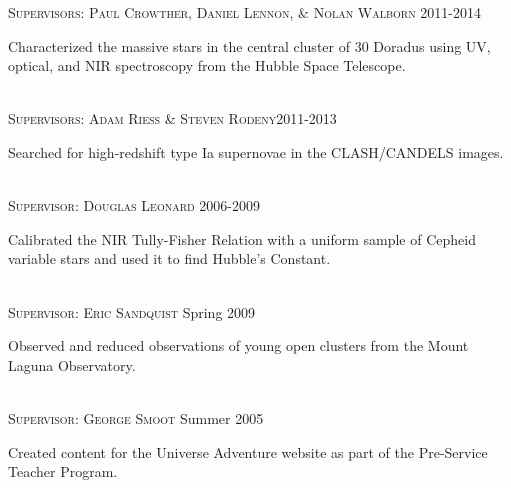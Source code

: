 \documentclass[10pt]{cv}
\begin{document}
\begin{llist}
\textsc{Supervisors: Paul Crowther, Daniel Lennon, \& Nolan Walborn} \hfill 2011-2014\\
\begin{minipage}[l]{0.7\textwidth}\vspace{0.15cm}
Characterized the massive stars in the central cluster of 30 Doradus using 
UV, optical, and NIR spectroscopy from the Hubble Space Telescope.\\
\end{minipage}
\\
\textsc{Supervisors: Adam Riess \& Steven Rodeny}\hfill 2011-2013\\
\begin{minipage}[l]{0.7\textwidth}\vspace{0.15cm}
Searched for high-redshift type Ia supernovae in the CLASH/CANDELS images.\\
\end{minipage}
\\
\textsc{Supervisor: Douglas Leonard} \hfill 2006-2009 \\
\begin{minipage}[l]{0.7\textwidth}\vspace{0.15cm}
Calibrated the NIR Tully-Fisher Relation with a uniform sample of Cepheid variable stars and used it to find Hubble's Constant.\\
\end{minipage}
\\
\textsc{Supervisor: Eric Sandquist} \hfill Spring 2009\\
\begin{minipage}[l]{0.7\textwidth}\vspace{0.15cm}
Observed and reduced observations of young open clusters from the Mount Laguna Observatory. \\ 
\end{minipage}
\\
\textsc{Supervisor: George Smoot} \hfill Summer 2005\\
\begin{minipage}[l]{0.7\textwidth}\vspace{0.15cm}
Created content for the Universe Adventure website as part of the 
Pre-Service Teacher Program.\\
\end{minipage}
\vspace{-0.1in}   

\end{llist}
\end{document}

